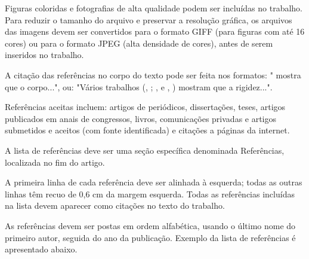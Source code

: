 \documentclass[10pt,fleqn,a4paper]{article}
\begin{document}
        Figuras coloridas e fotografias de alta qualidade podem ser incluídas no trabalho. Para reduzir o tamanho do arquivo e preservar a resolução gráfica, os arquivos das imagens devem ser convertidos para o  formato GIFF (para figuras com até 16 cores) ou para o formato JPEG (alta densidade de cores), antes de serem inseridos no trabalho.

        A citação das referências no corpo do texto pode ser feita nos formatos: "\citet{Bordalo89} mostra que o corpo...", ou: "Vários trabalhos (\citeauthor{Coimbra78}, \citeyear{Coimbra78}; \citeauthor{Clark86}, \citeyear{Clark86} e \citeauthor{Sparrow80},  \citeyear{Sparrow80}) mostram que a rigidez...".

        
        
        Referências aceitas incluem: artigos de periódicos, dissertações, teses, artigos publicados em anais de congressos, livros, comunicações privadas e artigos submetidos e aceitos (com fonte identificada) e citações a páginas da internet.

        A lista de referências deve ser uma seção específica denominada Referências, localizada no fim do artigo.

        A primeira linha de cada referência deve ser alinhada à esquerda; todas as outras linhas têm recuo de 0,6 cm da margem esquerda. Todas as referências incluídas na lista devem aparecer como citações no texto do trabalho.

        As referências devem ser postas em ordem alfabética, usando o último nome do primeiro autor, seguida do ano da publicação. Exemplo da lista de referências é apresentado abaixo.


    


    

    
\end{document}
